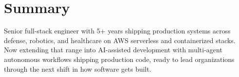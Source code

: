 \section{Summary}
\begin{itemize}[leftmargin=0.15in, label={}]
  \small{\item{
    Senior full-stack engineer with 5+ years shipping production systems across
    defense, robotics, and healthcare on AWS serverless and containerized stacks.
    Now extending that range into AI-assisted development with multi-agent
    autonomous workflows shipping production code, ready to lead organizations
    through the next shift in how software gets built.
  }}
\end{itemize}
